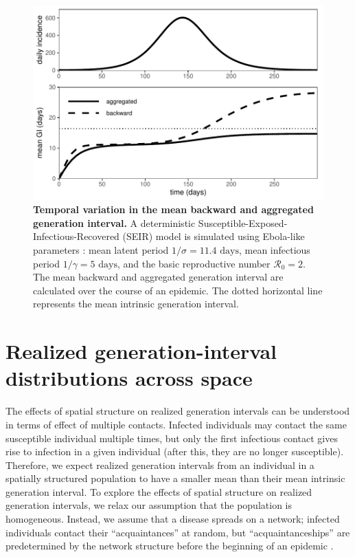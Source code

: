 \documentclass[12pt]{article}
\newcommand{\RR}{\ensuremath{{\mathcal R}}}
\begin{document}
\begin{figure}[!ht]
\includegraphics[width=\textwidth]{../fig/temporal_effect.pdf}
\caption{\textbf{Temporal variation in the mean backward and aggregated generation interval.}
A deterministic Susceptible-Exposed-Infectious-Recovered (SEIR) model is simulated using Ebola-like parameters \citep{who2014ebola}: mean latent period $1/\sigma = 11.4 \textrm{ days}$, mean infectious period $1/\gamma = 5 \textrm{ days}$, and the basic reproductive number $\RR_0 = 2$. 
The mean backward and aggregated generation interval are calculated over the course of an epidemic.
The dotted horizontal line represents the mean intrinsic generation interval.
}
\label{fig:censor}
\end{figure}

\section{Realized generation-interval distributions across space}

The effects of spatial structure on realized generation intervals can be understood in terms of effect of multiple contacts.
Infected individuals may contact the same susceptible individual multiple times, but only the first infectious contact gives rise to infection in a given individual (after this, they are no longer susceptible).
Therefore, we expect realized generation intervals from an individual in a spatially structured population to have a smaller mean than their mean intrinsic generation interval.
To explore the effects of spatial structure on realized generation intervals, we relax our assumption that the population is homogeneous.
Instead, we assume that a disease spreads on a network;
infected individuals contact their ``acquaintances'' at random, but ``acquaintanceships'' are predetermined by the network structure before the beginning of an epidemic \cite{trapman2016inferring}.
\end{document}
